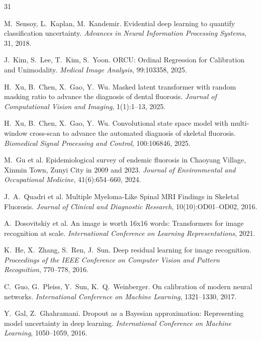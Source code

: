 \documentclass[12pt,a4paper]{ctexart}
\begin{document}
\begin{thebibliography}{31}

M.\ Sensoy, L.\ Kaplan, M.\ Kandemir.
Evidential deep learning to quantify classification uncertainty.
\textit{Advances in Neural Information Processing Systems}, 31, 2018.

J.\ Kim, S.\ Lee, T.\ Kim, S.\ Yoon.
ORCU: Ordinal Regression for Calibration and Unimodality.
\textit{Medical Image Analysis}, 99:103358, 2025.

H.\ Xu, B.\ Chen, X.\ Gao, Y.\ Wu.
Masked latent transformer with random masking ratio to advance the diagnosis of dental fluorosis.
\textit{Journal of Computational Vision and Imaging}, 1(1):1--13, 2025.

H.\ Xu, B.\ Chen, X.\ Gao, Y.\ Wu.
Convolutional state space model with multi-window cross-scan to advance the automated diagnosis of skeletal fluorosis.
\textit{Biomedical Signal Processing and Control}, 100:106846, 2025.

M.\ Gu et al.
Epidemiological survey of endemic fluorosis in Chaoyang Village, Xinmin Town, Zunyi City in 2009 and 2023.
\textit{Journal of Environmental and Occupational Medicine}, 41(6):654--660, 2024.

J.\ A.\ Quadri et al.
Multiple Myeloma-Like Spinal MRI Findings in Skeletal Fluorosis.
\textit{Journal of Clinical and Diagnostic Research}, 10(10):OD01--OD02, 2016.

A.\ Dosovitskiy et al.
An image is worth 16x16 words: Transformers for image recognition at scale.
\textit{International Conference on Learning Representations}, 2021.

K.\ He, X.\ Zhang, S.\ Ren, J.\ Sun.
Deep residual learning for image recognition.
\textit{Proceedings of the IEEE Conference on Computer Vision and Pattern Recognition}, 770--778, 2016.

C.\ Guo, G.\ Pleiss, Y.\ Sun, K.\ Q.\ Weinberger.
On calibration of modern neural networks.
\textit{International Conference on Machine Learning}, 1321--1330, 2017.

Y.\ Gal, Z.\ Ghahramani.
Dropout as a Bayesian approximation: Representing model uncertainty in deep learning.
\textit{International Conference on Machine Learning}, 1050--1059, 2016.


\end{thebibliography}
\end{document}

